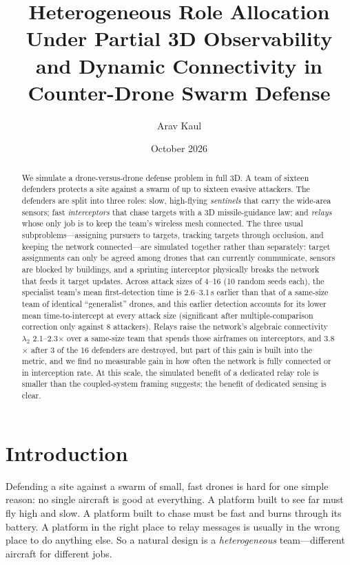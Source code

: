 \documentclass[10pt,twocolumn]{article}
\title{Heterogeneous Role Allocation Under Partial 3D Observability and
Dynamic Connectivity in Counter-Drone Swarm Defense}
\author{Arav Kaul}
\date{October 2026}
\begin{document}
\maketitle

\begin{abstract}
We simulate a drone-versus-drone defense problem in full 3D. A team of
sixteen defenders protects a site against a swarm of up to sixteen evasive
attackers. The defenders are split into three roles: slow, high-flying
\emph{sentinels} that carry the wide-area sensors; fast
\emph{interceptors} that chase targets with a 3D missile-guidance law; and
\emph{relays} whose only job is to keep the team's wireless mesh connected.
The three usual subproblems---assigning pursuers to targets, tracking
targets through occlusion, and keeping the network connected---are simulated
together rather than separately: target assignments can only be agreed among
drones that can currently communicate, sensors are blocked by buildings, and
a sprinting interceptor physically breaks the network that feeds it target
updates. Across attack sizes of 4--16 (10 random seeds each), the specialist
team's mean first-detection time is 2.6--3.1\,s earlier than that of a
same-size team of identical ``generalist'' drones, and this earlier
detection accounts for its lower mean time-to-intercept at every attack
size (significant after multiple-comparison correction only against 8
attackers). Relays raise the network's algebraic
connectivity $\lambda_2$ 2.1--2.3$\times$ over a same-size team that spends
those airframes on interceptors, and 3.8$\times$ after 3 of the 16 defenders
are destroyed, but part of this gain is built into the metric, and we find no
measurable gain in how often the network is fully connected or in
interception rate. At this scale, the simulated benefit of a dedicated relay
role is smaller than the coupled-system framing suggests; the benefit of
dedicated sensing is clear.
\end{abstract}

\section{Introduction}
Defending a site against a swarm of small, fast drones is hard for one
simple reason: no single aircraft is good at everything. A platform built to
see far must fly high and slow. A platform built to chase must be fast and
burns through its battery. A platform in the right place to relay messages
is usually in the wrong place to do anything else. So a natural design is a
\emph{heterogeneous} team---different aircraft for different jobs.
\end{document}
